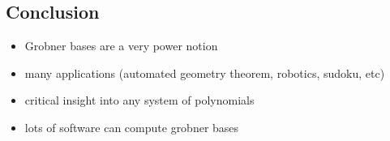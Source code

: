 \documentclass[11pt]{article}
\begin{document}
\subsection*{Conclusion}
\label{sec:orgc0801a3}
\begin{itemize}
\item Grobner bases are a very power notion
\item many applications (automated geometry theorem, robotics, sudoku, etc)
\item critical insight into any system of polynomials
\item lots of software can compute grobner bases
\end{itemize}
\end{document}
